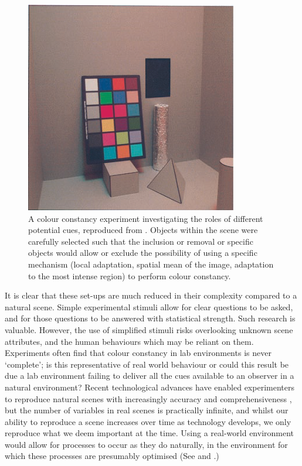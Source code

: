 \begin{figure}[htbp]
\includegraphics[max width=\textwidth]{figs/tablet/KraftBrainard.png}
\caption{A colour constancy experiment investigating the roles of different potential cues, reproduced from \citet{kraft_mechanisms_1999}. Objects within the scene were carefully selected such that the inclusion or removal or specific objects would allow or exclude the possibility of using a specific mechanism (local adaptation, spatial mean of the image, adaptation to the most intense region) to perform colour constancy.}
\label{fig:KraftBrainard}
\end{figure}

It is clear that these set-ups are much reduced in their complexity compared to a natural scene. Simple experimental stimuli allow for clear questions to be asked, and for those questions to be answered with statistical strength. Such research is valuable. However, the use of simplified stimuli risks overlooking unknown scene attributes, and the human behaviours which may be reliant on them. Experiments often find that colour constancy in lab environments is never `complete'; is this representative of real world behaviour or could this result be due a lab environment failing to deliver all the cues available to an observer in a natural environment? Recent technological advances have enabled experimenters to reproduce natural scenes with increasingly accuracy and comprehensiveness \citep{heasly_rendertoolbox3_2014}, but the number of variables in real scenes is practically infinite, and whilst our ability to reproduce a scene increases over time as technology develops, we only reproduce what we deem important at the time. Using a real-world environment would allow for processes to occur as they do naturally, in the environment for which these processes are presumably optimised (See \citet{kelly_chips_2018} and \citet{shepard_perceptual_1992}.)

